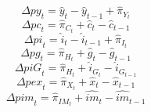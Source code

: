 \begin{dmath}
{\Delta{py}_{t}}={\hat{y}_{t}}-{\hat{y}_{t-1}}+{\hat{\pi}_{Y}_{t}}
\end{dmath}
\begin{dmath}
{\Delta{pc}_{t}}={\hat{\pi}_{C}_{t}}+{\hat{c}_{t}}-{\hat{c}_{t-1}}
\end{dmath}
\begin{dmath}
{\Delta{pi}_{t}}={\hat{i}_{t}}-{\hat{i}_{t-1}}+{\hat{\pi}_{I}_{t}}
\end{dmath}
\begin{dmath}
{\Delta{pg}_{t}}={\hat{\pi}_{H}_{t}}+{\hat{g}_{t}}-{\hat{g}_{t-1}}
\end{dmath}
\begin{dmath}
{\Delta{piG}_{t}}={\hat{\pi}_{H}_{t}}+{\hat{i}_G_{t}}-{\hat{i}_G_{t-1}}
\end{dmath}
\begin{dmath}
{\Delta{pex}_{t}}={\hat{\pi}_{X}_{t}}+{\hat{x}_{t}}-{\hat{x}_{t-1}}
\end{dmath}
\begin{dmath}
{\Delta{pim}_{t}}={\hat{\pi}_{IM}_{t}}+{\hat{im}_{t}}-{\hat{im}_{t-1}}
\end{dmath}
